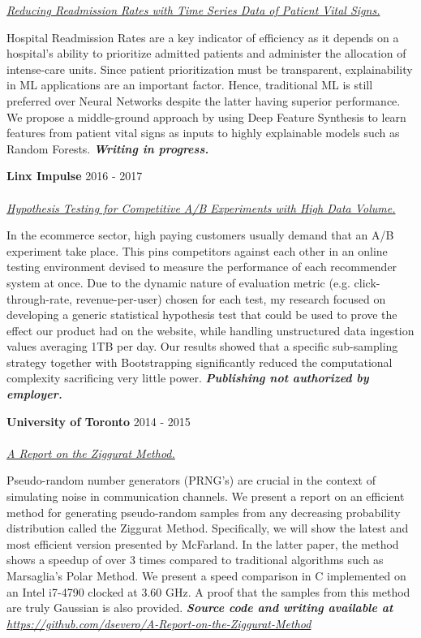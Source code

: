 \documentclass[margin, line]{res}
\begin{document}
\begin{resume}
\underline{\sl Reducing Readmission Rates with Time Series Data of Patient Vital Signs.}\\
\begin{small}
    Hospital Readmission Rates are a key indicator of efficiency as it depends on a hospital's ability to prioritize admitted patients and administer the allocation of intense-care units. Since patient prioritization must be transparent, explainability in ML applications are an important factor. Hence, traditional ML is still preferred over Neural Networks despite the latter having superior performance. We propose a middle-ground approach by using Deep Feature Synthesis to learn features from patient vital signs as inputs to highly explainable models such as Random Forests. {\sl \textbf{Writing in progress.}}
\end{small}

\textbf{Linx Impulse} \hfill 2016 - 2017\\
\\
\underline{\sl Hypothesis Testing for Competitive A/B Experiments with High Data Volume.}\\
\begin{small}
    In the ecommerce sector, high paying customers usually demand that an A/B experiment take place. This pins competitors against each other in an online testing environment devised to measure the performance of each recommender system at once. Due to the dynamic nature of evaluation metric (e.g. click-through-rate, revenue-per-user) chosen for each test, my research focused on developing a generic statistical hypothesis test that could be used to prove the effect our product had on the website, while handling unstructured data ingestion values averaging 1TB per day. Our results showed that a specific sub-sampling strategy together with Bootstrapping significantly reduced the computational complexity sacrificing very little power. {\sl \textbf{Publishing not authorized by employer.}}
\end{small}

\textbf{University of Toronto} \hfill 2014 - 2015\\
\\
\underline{\sl A Report on the Ziggurat Method.}\\
\begin{small}
    Pseudo-random number generators (PRNG's) are crucial in the context of simulating noise in communication channels. We present a report on an efficient method for generating pseudo-random samples from any decreasing probability distribution called the Ziggurat Method. Specifically, we will show the latest and most efficient version presented by McFarland. In the latter paper, the method shows a speedup of over 3 times compared to traditional algorithms such as Marsaglia's Polar Method. We present a speed comparison in C implemented on an Intel i7-4790 clocked at 3.60 GHz. A proof that the samples from this method are truly Gaussian is also provided. {\sl \textbf{Source code and writing available at} \url{https://github.com/dsevero/A-Report-on-the-Ziggurat-Method}}
\end{small}


\end{resume}
\end{document}
